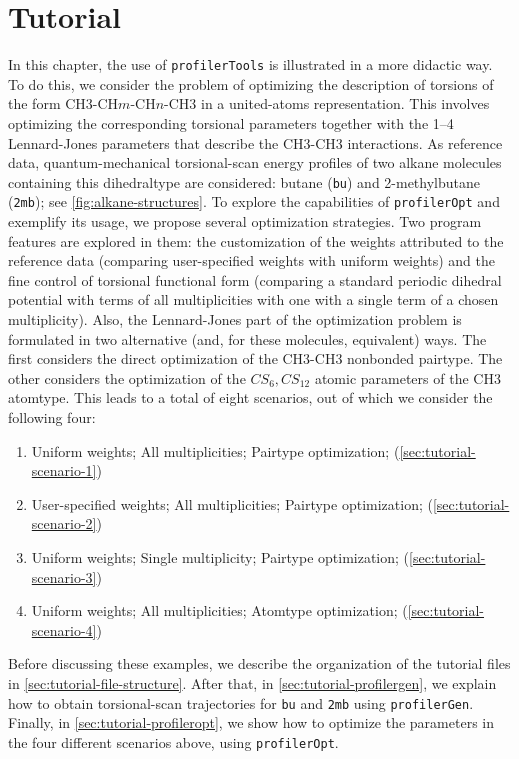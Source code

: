 \documentclass[10pt,a4paper,openany]{memoir}
\numberwithin{equation}{section}
\newcommand{\profileropt}[0]{\texttt{profilerOpt}}
\newcommand{\profilergen}[0]{\texttt{profilerGen}}
\newcommand{\profilertools}[0]{\texttt{profilerTools}}
\begin{document}
\chapter{Tutorial}
\label{chap:tutorial}
 
In this chapter, the use of \profilertools{} is illustrated in a more
didactic way.
%
To do this, we consider the problem of optimizing the description of
torsions of the form CH3-CH$m$-CH$n$-CH3 in a united-atoms
representation.
%
This involves optimizing the corresponding torsional parameters
together with the 1--4 Lennard-Jones parameters that describe the
CH3-CH3 interactions.
%
As reference data, quantum-mechanical torsional-scan energy profiles
of two alkane molecules containing this dihedraltype are considered:
butane (\texttt{bu}) and 2-methylbutane (\texttt{2mb}); see
\autoref{fig:alkane-structures}.
%
To explore the capabilities of \profileropt{} and exemplify its usage,
we propose several optimization strategies.
%
Two program features are explored in them:
%
the customization of the weights attributed to the reference data
(comparing user-specified weights with uniform weights) and the fine
control of torsional functional form (comparing a standard periodic
dihedral potential with terms of all multiplicities with one with a
single term of a chosen multiplicity).
%
Also, the Lennard-Jones part of the optimization problem is formulated
in two alternative (and, for these molecules, equivalent) ways.
%
The first considers the direct optimization of the CH3-CH3 nonbonded
pairtype.
%
The other considers the optimization of the $CS_6,CS_{12}$ atomic
parameters of the CH3 atomtype.
%
This leads to a total of eight scenarios, out of which we consider the
following four:
%
\begin{enumerate}
\item Uniform weights; All multiplicities; Pairtype optimization;
  (\autoref{sec:tutorial-scenario-1})
\item User-specified weights; All multiplicities; Pairtype
  optimization; (\autoref{sec:tutorial-scenario-2})
\item Uniform weights; Single multiplicity; Pairtype optimization;
  (\autoref{sec:tutorial-scenario-3})
\item Uniform weights; All multiplicities; Atomtype optimization;
  (\autoref{sec:tutorial-scenario-4})
\end{enumerate}
%
Before discussing these examples, we describe the organization of the
tutorial files in \autoref{sec:tutorial-file-structure}.  After that,
in \autoref{sec:tutorial-profilergen}, we explain how to obtain
torsional-scan trajectories for \texttt{bu} and \texttt{2mb} using
\profilergen{}. Finally, in \autoref{sec:tutorial-profileropt}, we
show how to optimize the parameters in the four different scenarios
above, using \profileropt{}.
\end{document}
